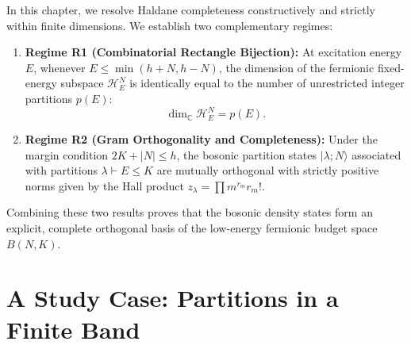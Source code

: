 In this chapter, we resolve Haldane completeness constructively and strictly within finite dimensions. We establish two complementary regimes:
\begin{enumerate}
    \item \textbf{Regime R1 (Combinatorial Rectangle Bijection):} At excitation energy $E$, whenever $E \le \min(h+N, h-N)$, the dimension of the fermionic fixed-energy subspace $\mathcal{H}^N_E$ is identically equal to the number of unrestricted integer partitions $p(E)$:
    \begin{equation}
    \dim_{\mathbb{C}} \mathcal{H}^N_E = p(E).
    \end{equation}
    \item \textbf{Regime R2 (Gram Orthogonality and Completeness):} Under the margin condition $2K + |N| \le h$, the bosonic partition states $|\lambda; N\rangle$ associated with partitions $\lambda \vdash E \le K$ are mutually orthogonal with strictly positive norms given by the Hall product $z_\lambda = \prod m^{r_m} r_m!$.
\end{enumerate}
Combining these two results proves that the bosonic density states form an explicit, complete orthogonal basis of the low-energy fermionic budget space $B(N, K)$.

\section{A Study Case: Partitions in a Finite Band}
\label{sec:haldane_h5_example}

